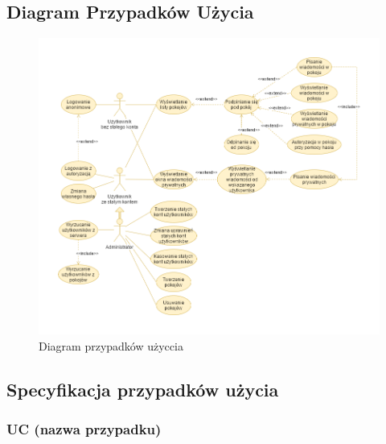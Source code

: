 \documentclass[11pt,oneside,a4paper,titlepage,onecolumn]{article}
\begin{document}
\subsection{Diagram Przypadków Użycia}
\begin{figure}[h]
	\centering
	\includegraphics[width=\textwidth]{viuavm-dpu}
	\caption{Diagram przypadków użyccia}
\end{figure}

\subsection{Specyfikacja przypadków użycia}

\subsubsection{UC (nazwa przypadku)}
\end{document}
